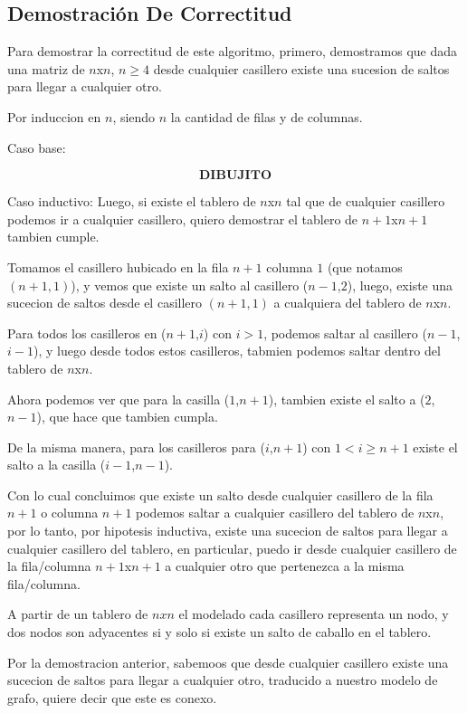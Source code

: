 \newpage
\subsection{Demostraci\'on De Correctitud}

Para demostrar la correctitud de este algoritmo, primero, demostramos que dada una matriz de $n$x$n$, $n \geq 4$ desde cualquier casillero existe una sucesion de saltos para llegar a cualquier otro. 

Por induccion en $n$, siendo $n$ la cantidad de filas y de columnas.

Caso base:

$$\textbf{DIBUJITO}$$



Caso inductivo:
Luego, si existe el tablero de $n$x$n$ tal que de cualquier casillero podemos ir a cualquier casillero, quiero demostrar el tablero de $n+1$x$n+1$ tambien cumple.

Tomamos el casillero hubicado en la fila $n+1$ columna $1$ (que notamos $(n+1,1)$), y vemos que existe un salto al casillero ($n-1$,$2$), luego, existe una sucecion de saltos desde el casillero $(n+1,1)$ a cualquiera del tablero de $n$x$n$.

Para todos los casilleros en ($n+1$,$i$) con $i>1$, podemos saltar al casillero ($n-1$,$i-1$), y luego desde todos estos casilleros, tabmien podemos saltar dentro del tablero de $n$x$n$.

Ahora podemos ver que para la casilla ($1$,$n+1$), tambien existe el salto a ($2$,$n-1$), que hace que tambien cumpla.

De la misma manera, para los casilleros para ($i$,$n+1$) con $1< i \geq n+1$ existe el salto a la casilla ($i-1$,$n-1$).

Con lo cual concluimos que existe un salto desde cualquier casillero de la fila $n+1$ o columna $n+1$ podemos saltar a cualquier casillero del tablero de $n$x$n$, por lo tanto, por hipotesis inductiva, existe una sucecion de saltos para llegar a cualquier casillero del tablero, en particular, puedo ir desde cualquier casillero de la fila/columna $n+1$x$n+1$ a cualquier otro que pertenezca a la misma fila/columna.

A partir de un tablero de $nxn$ el modelado cada casillero representa un nodo, y dos nodos son adyacentes si y solo si existe un salto de caballo en el tablero.

Por la demostracion anterior, sabemoos que desde cualquier casillero existe una sucecion de saltos para llegar a cualquier otro, traducido a nuestro modelo de grafo, quiere decir que este es conexo.

